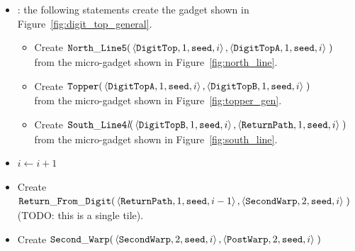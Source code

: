 \begin{itemize}
    \item {\dtop}: the following statements create the gadget shown in Figure~\ref{fig:digit_top_general}.
    \begin{itemize}
        \item Create
        $\begin{aligned}[t]
            {\tt North\_Line5}(& \left \langle {\tt DigitTop},  1, {\tt seed}, i \right\rangle,
                                 \left \langle {\tt DigitTopA}, 1, {\tt seed}, i \right\rangle \;)
        \end{aligned}$\\ from the micro-gadget shown in Figure~\ref{fig:north_line}.

        \item Create
        $\begin{aligned}[t]
            {\tt Topper}(& \left\langle {\tt DigitTopA}, 1, {\tt seed}, i \right\rangle,
                           \left\langle {\tt DigitTopB}, 1, {\tt seed}, i \right\rangle \;)
        \end{aligned}$\\ from the micro-gadget shown in Figure~\ref{fig:topper_gen}.

        \item Create
        $\begin{aligned}[t]
            {\tt South\_Line4\textit{l}}(& \left\langle {\tt DigitTopB}, 1, {\tt seed}, i\right\rangle,
                                           \left\langle {\tt ReturnPath},     1, {\tt seed}, i\right\rangle \;)
        \end{aligned}$\\ from the micro-gadget shown in Figure~\ref{fig:south_line}.
    \end{itemize}

    \item $i \gets i + 1$

    \item Create
    $\begin{aligned}[t]
            {\tt Return\_From\_Digit}(&\left\langle {\tt ReturnPath},      1, {\tt seed}, i - 1\right\rangle,
                              \left\langle {\tt SecondWarp}, 2, {\tt seed}, i    \right\rangle \;)
    \end{aligned}$\\ (TODO: this is a single tile).

    \item Create
    $\begin{aligned}[t]
        {\tt Second\_Warp}(&\left\langle {\tt SecondWarp}, 2, {\tt seed}, i \right\rangle,
                     \left\langle {\tt PostWarp},   2, {\tt seed}, i \right\rangle \;)
    \end{aligned}$


\end{itemize}
